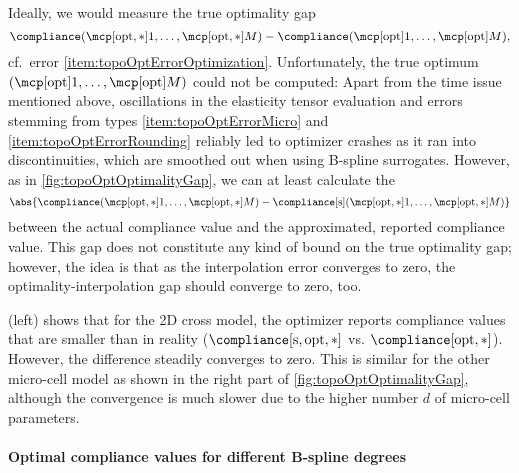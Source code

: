 Ideally, we would measure the true optimality gap
\begin{equation}
  \label{eq:topoOptOptimalityGapTrue}
  \compliance(\mcpoptappr{1}, \dotsc, \mcpoptappr{M}) -
  \compliance(\mcpopt{1}, \dotsc, \mcpopt{M}),
\end{equation}
cf.\ error \ref{item:topoOptErrorOptimization}.
Unfortunately, the true optimum
$(\mcpopt{1}, \dotsc, \mcpopt{M})$ could not be computed:
Apart from the time issue mentioned above,
oscillations in the elasticity tensor evaluation and
errors stemming from types
\ref{item:topoOptErrorMicro} and \ref{item:topoOptErrorRounding}
reliably led to optimizer crashes as it ran into discontinuities,
which are smoothed out when using B-spline surrogates.
However, as in \cref{fig:topoOptOptimalityGap},
we can at least calculate the 
\begin{equation}
  \label{eq:topoOptOptimalityGapPseudo}
  \abs{
    \compliance(\mcpoptappr{1}, \dotsc, \mcpoptappr{M}) -
    \complianceintp(\mcpoptappr{1}, \dotsc, \mcpoptappr{M})
  }
\end{equation}
between the actual compliance value
and the approximated, reported compliance value.
This gap does not constitute any kind of bound on the true optimality gap;
however, the idea is that
as the interpolation error converges to zero,
the optimality-interpolation gap should converge to zero, too.

 (left) shows that for the 2D cross model,
the optimizer reports compliance values that are smaller than in reality
($\complianceintp[\opt,\ast]$ vs. $\compliance[\opt,\ast]$).
However, the difference steadily converges to zero.
This is similar for the other micro-cell model as shown in the
right part of \cref{fig:topoOptOptimalityGap},
although the convergence is much slower due to the
higher number $d$ of micro-cell parameters.

\paragraph{Optimal compliance values for different B-spline degrees}

